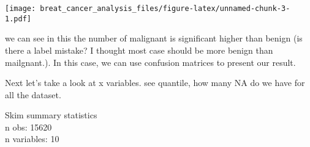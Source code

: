 \documentclass[]{article}
\newenvironment{Shaded}{\begin{snugshade}}{\end{snugshade}}
\newcommand{\DataTypeTok}[1]{\textcolor[rgb]{0.13,0.29,0.53}{#1}}
\newcommand{\KeywordTok}[1]{\textcolor[rgb]{0.13,0.29,0.53}{\textbf{#1}}}
\newcommand{\NormalTok}[1]{#1}
\newcommand{\OperatorTok}[1]{\textcolor[rgb]{0.81,0.36,0.00}{\textbf{#1}}}
\newcommand{\StringTok}[1]{\textcolor[rgb]{0.31,0.60,0.02}{#1}}
\begin{document}
\begin{Shaded}
\end{Shaded}

\texttt{[image: breat\_cancer\_analysis\_files/figure-latex/unnamed-chunk-3-1.pdf]}

we can see in this the number of malignant is significant higher than
benign (is there a label mistake? I thought most case should be more
benign than mailgnant.). In this case, we can use confusion matrices to
present our result.

Next let's take a look at x variables. see quantile, how many NA do we
have for all the dataset.

\begin{Shaded}
\end{Shaded}

Skim summary statistics\\
n obs: 15620\\
n variables: 10
\end{document}
